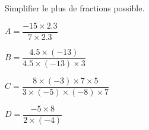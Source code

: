 \begin{exercice*}
    Simplifier le plus de fractions possible.

    \hspace*{-10mm}
    \begin{minipage}{\linewidth}
        \begin{multicols}{2}        
            \begin{spacing}{2}            
                \begin{list}{}{}
                    \item $A=\dfrac{-15\times\num{2.3}}{7\times\num{2.3}}$
                    \item $B=\dfrac{\num{4.5}\times (-13)}{\num{4.5}\times (-13)\times 3}$
                    \item $C=\dfrac{8\times (-3)\times 7\times 5}{3\times (-5)\times (-8)\times 7}$
                    \item $D=\dfrac{-5\times 8}{2\times (-4)}$
                \end{list}
            \end{spacing}        
        \end{multicols}
    \end{minipage}
\end{exercice*}
